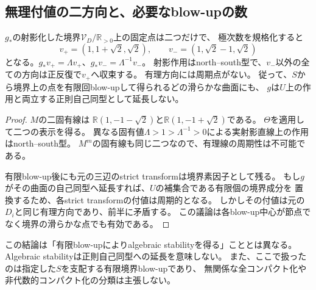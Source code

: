\subsection{無理付値の二方向と、必要なblow-upの数}
\begin{theorem}[二次無理数の固有付値と非正則化]
\label{thm:irrational-boundary-nonregularization}
$g_*$の射影化した境界$\mathcal V_D/\mathbb R_{>0}$上の固定点は二つだけで、
極次数を規格化すると
\[
 v_+=(1,1+\sqrt2,\sqrt2),\qquad
 v_-=(1,\sqrt2-1,\sqrt2)
\]
となる。$g_*v_+=\Lambda v_+$、$g_*v_-=\Lambda^{-1}v_-$。
射影作用はnorth--south型で、$v_-$以外の全ての方向は正反復で$v_+$へ収束する。
有理方向には周期点がない。
従って、$S$から境界上の点を有限回blow-upして得られるどの滑らかな曲面にも、
$g$は$U$上の作用と両立する正則自己同型として延長しない。
\end{theorem}
\begin{proof}
$M$の二固有線は
$\mathbb R(1,-1-\sqrt2)$と$\mathbb R(1,-1+\sqrt2)$である。
$\Theta$を適用して二つの表示を得る。
異なる固有値$\Lambda>1>\Lambda^{-1}>0$による実射影直線上の作用はnorth--south型。
$M^m$の固有線も同じ二つなので、有理線の周期性は不可能である。

有限blow-up後にも元の三辺のstrict transformは境界素因子として残る。
もし$g$がその曲面の自己同型へ延長すれば、$U$の補集合である有限個の境界成分を
置換するため、各strict transformの付値は周期的となる。
しかしその付値は元の$D_i$と同じ有理方向であり、前半に矛盾する。
この議論は各blow-up中心が節点でなく境界の滑らかな点でも有効である。
\end{proof}

この結論は「有限blow-upによりalgebraic stabilityを得る」こととは異なる。
Algebraic stabilityは正則自己同型への延長を意味しない。
また、ここで扱ったのは指定した$S$を支配する有限境界blow-upであり、
無関係な全コンパクト化や非代数的コンパクト化の分類は主張しない。

